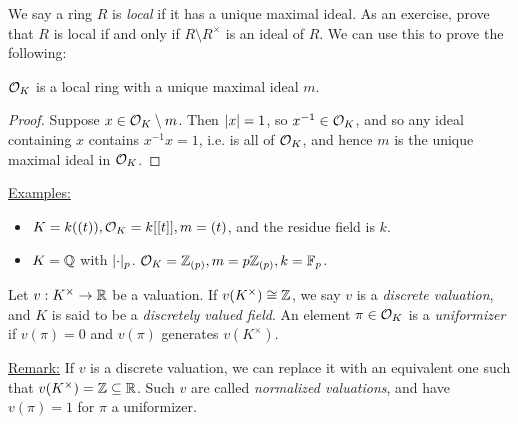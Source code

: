 \documentclass[10pt,a4paper]{article}
\begin{document}
We say a ring $R$ is \emph{local} if it has a unique maximal ideal. As an exercise, prove that $R$ is local if and only if $R\setminus R^\times$ is an ideal of $R$. We can use this to prove the following:

\begin{corollary}
  $\mathcal{O}_K$ is a local ring with a unique maximal ideal $m$.
\end{corollary}
\begin{proof}
  Suppose $x \in \mathcal{O}_K \setminus m$. Then $\lvert x\rvert = 1$, so $x^{-1} \in \mathcal{O}_K$, and so any ideal containing $x$ contains $x^{-1}x = 1$, i.e. is all of $\mathcal{O}_K$, and hence $m$ is the unique maximal ideal in $\mathcal{O}_K$.
\end{proof}

\underline{Examples:}
\begin{itemize}
  \item $K = k((t)), \mathcal{O}_K = k[[t]], m = (t)$, and the residue field is $k$.
  \item $K = \mathbb{Q}$ with $\lvert\cdot\rvert_p$. $\mathcal{O}_K = \mathbb{Z}_{(p)}, m = p\mathbb{Z}_{(p)}, k = \mathbb{F}_p$.
\end{itemize}

\begin{definition}
  Let $v : K^\times \to \mathbb{R}$ be a valuation. If $v(K^\times) \cong \mathbb{Z}$, we say $v$ is a \emph{discrete valuation}, and $K$ is said to be a \emph{discretely valued field}. An element $\pi \in \mathcal{O}_K$ is a \emph{uniformizer} if $v(\pi) = 0$ and $v(\pi)$ generates $v(K^\times)$.
\end{definition}
\underline{Remark:} If $v$ is a discrete valuation, we can replace it with an equivalent one such that $v(K^\times) = \mathbb{Z} \subseteq \mathbb{R}$. Such $v$ are called \emph{normalized valuations}, and have $v(\pi) = 1$ for $\pi$ a uniformizer.
\end{document}
